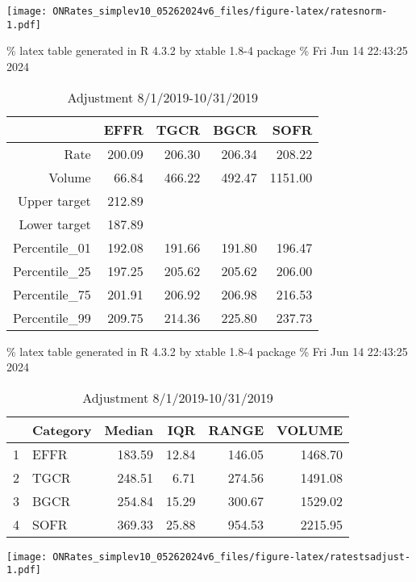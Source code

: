 \documentclass[
]{article}
\let\origfigure\figure
\let\endorigfigure\endfigure
\renewenvironment{figure}[1][2] {
    \expandafter\origfigure\expandafter[H]
} {
    \endorigfigure
}
\begin{document}
\begin{figure}
\centering
\texttt{[image: ONRates\_simplev10\_05262024v6\_files/figure-latex/ratesnorm-1.pdf]}
\caption{\label{fig:ratesnorm}EFFR during normalcy period 3/4/2016-7/31/2019}
\end{figure}

\% latex table generated in R 4.3.2 by xtable 1.8-4 package
\% Fri Jun 14 22:43:25 2024

\begin{table}[ht]
\centering
\begin{tabular}{rrrrr}
  \hline
 & EFFR & TGCR & BGCR & SOFR \\ 
  \hline
Rate & 200.09 & 206.30 & 206.34 & 208.22 \\ 
  Volume & 66.84 & 466.22 & 492.47 & 1151.00 \\ 
  Upper target & 212.89 &  &  &  \\ 
  Lower target & 187.89 &  &  &  \\ 
  Percentile\_01 & 192.08 & 191.66 & 191.80 & 196.47 \\ 
  Percentile\_25 & 197.25 & 205.62 & 205.62 & 206.00 \\ 
  Percentile\_75 & 201.91 & 206.92 & 206.98 & 216.53 \\ 
  Percentile\_99 & 209.75 & 214.36 & 225.80 & 237.73 \\ 
   \hline
\end{tabular}
\caption{Adjustment 8/1/2019-10/31/2019} 
\end{table}

\% latex table generated in R 4.3.2 by xtable 1.8-4 package
\% Fri Jun 14 22:43:25 2024

\begin{table}[ht]
\centering
\begin{tabular}{rlrrrr}
  \hline
 & Category & Median & IQR & RANGE & VOLUME \\ 
  \hline
1 & EFFR & 183.59 & 12.84 & 146.05 & 1468.70 \\ 
  2 & TGCR & 248.51 & 6.71 & 274.56 & 1491.08 \\ 
  3 & BGCR & 254.84 & 15.29 & 300.67 & 1529.02 \\ 
  4 & SOFR & 369.33 & 25.88 & 954.53 & 2215.95 \\ 
   \hline
\end{tabular}
\caption{Adjustment 8/1/2019-10/31/2019} 
\end{table}

\begin{figure}
\centering
\texttt{[image: ONRates\_simplev10\_05262024v6\_files/figure-latex/ratestsadjust-1.pdf]}
\caption{\label{fig:ratestsadjust}Rates during mid cycle adjustment 8/1/2019-10/31/2019}
\end{figure}
\end{document}
